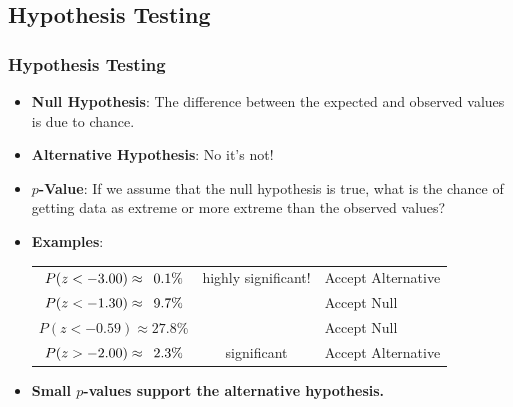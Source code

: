 \documentclass[t]{beamer}
\begin{document}
\subsection{Hypothesis Testing}
\begin{frame}
\frametitle{Hypothesis Testing}
{%

\begin{itemize}
\item \textbf{\color{blue}Null Hypothesis}:  The difference between the expected and observed
values is due to chance.
\item \textbf{\color{blue}Alternative Hypothesis}:  No it's not!
\item \textbf{\color{blue}$p$-Value}:  If we assume that the null hypothesis is true, what is
the chance of getting data as extreme or more extreme than the observed values?
\item \textbf{\color{blue}Examples}:\vspace{-1pt}
\begin{center}
\begin{tabular}{ccl}
   $P(z < -3.00) \approx \hphantom{0}0.1\%$ & highly significant! & Accept Alternative\\[5pt]
   $P(z < -1.30) \approx \hphantom{0}9.7\%$ &  & Accept Null\\[5pt]
   $P(z < -0.59) \approx 27.8\%$            &  & Accept Null\\[5pt]
   $P(z > -2.00) \approx \hphantom{0}2.3\%$       & significant & Accept Alternative 
\end{tabular}
\end{center}
\item \textbf{Small $p$-values support the alternative hypothesis.}
\end{itemize}

}

\end{frame}
\end{document}
